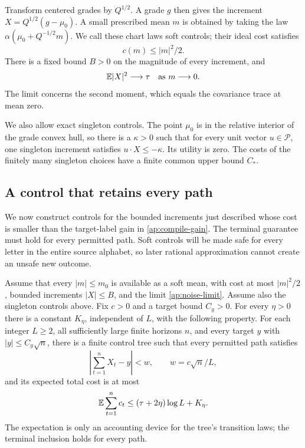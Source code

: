 Transform centered grades by \(Q^{1/2}\).  A grade \(g\) then gives the
increment \(X=Q^{1/2}(g-\mu_0)\).  A small prescribed mean \(m\) is
obtained by taking the law
\(\alpha(\mu_0+Q^{-1/2}m)\).  We call these chart laws soft controls;
their ideal cost satisfies
\begin{equation}\label{ap:drift-cost}
 c(m)\leq |m|^2/2.
\end{equation}
There is a fixed bound \(B>0\) on the magnitude of every increment, and
\begin{equation}\label{ap:noise-limit}
 \mathbb E|X|^2\longrightarrow\tau\quad\hbox{as }m\longrightarrow0.
\end{equation}
The limit concerns the second moment, which equals the covariance trace
at mean zero.

We also allow exact singleton controls.  The point \(\mu_0\) is in the
relative interior of the grade convex hull, so there is a \(\kappa>0\)
such that for every unit vector \(u\in\mathcal P\), one singleton
increment satisfies \(u\cdot X\leq-\kappa\).  Its utility is zero.
The costs of the finitely many singleton choices have a finite common
upper bound \(C_*\).

\subsection{A control that retains every path}

We now construct controls for the bounded increments just described whose
cost is smaller than the target-label gain in \eqref{ap:compile-gain}.
The terminal guarantee must hold for every permitted path.  Soft controls
will be made safe for every letter in the entire source alphabet, so later
rational approximation cannot create an unsafe new outcome.

\begin{lemma}\label{ap:corridor}
Assume that every \(|m|\leq m_0\) is available as a soft mean, with
cost at most \(|m|^2/2\), bounded increments \(|X|\leq B\), and the
limit \eqref{ap:noise-limit}.  Assume also the singleton controls above.
Fix \(c>0\) and a target bound \(C_y>0\).  For every \(\eta>0\)
there is a constant \(K_\eta\), independent of \(L\), with the following
property.  For each integer \(L\geq2\), all sufficiently large finite
horizons \(n\), and every target \(y\) with \(|y|\leq C_y\sqrt n\),
there is a finite control tree such that every permitted path satisfies
\[
 \left|\sum_{t=1}^n X_t-y\right|<w,
 \qquad w=c\sqrt n/L,
\]
and its expected total cost is at most
\begin{equation}\label{ap:total-cost}
 \mathbb E\sum_{t=1}^n c_t\leq(\tau+2\eta)\log L+K_\eta.
\end{equation}
The expectation is only an accounting device for the tree's transition
laws; the terminal inclusion holds for every path.
\end{lemma}

